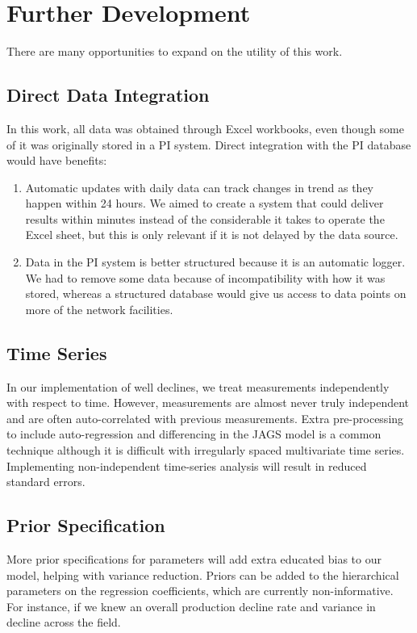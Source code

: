 \documentclass[a4paper, 12pt]{article}
\begin{document}
\section{Further Development}
There are many opportunities to expand on the utility of this work.

\subsection{Direct Data Integration}
In this work, all data was obtained through Excel workbooks, even though some of it was originally stored in a PI system. Direct integration with the PI database would have benefits:

\begin{enumerate}
\item Automatic updates with daily data can track changes in trend as they happen within 24 hours.  We aimed to create a system that could deliver results within minutes instead of the considerable it takes to operate the Excel sheet, but this is only relevant if it is not delayed by the data source.
\item Data in the PI system is better structured because it is an automatic logger. We had to remove some data because of incompatibility with how it was stored, whereas a structured database would give us access to data points on more of the network facilities.
\end{enumerate}

\subsection{Time Series}
In our implementation of well declines, we treat measurements independently with respect to time. However, measurements are almost never truly independent and are often auto-correlated with previous measurements. Extra pre-processing to include auto-regression and differencing in the JAGS model is a common technique although it is difficult with irregularly spaced multivariate time series. Implementing non-independent time-series analysis will result in reduced standard errors.

\subsection{Prior Specification}
More prior specifications for parameters will add extra educated bias to our model, helping with variance reduction. Priors can be added to the hierarchical parameters on the regression coefficients, which are currently non-informative. For instance, if we knew an overall production decline rate and variance in decline across the field.
\end{document}
